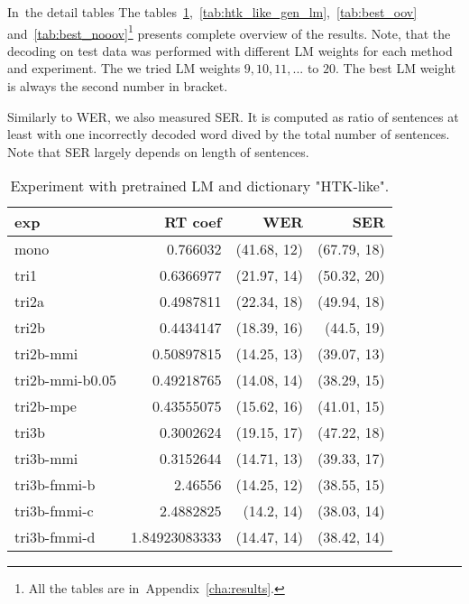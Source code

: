 In~the detail tables 
The tables~\ref{tab:htk_like},~\ref{tab:htk_like_gen_lm},~\ref{tab:best_oov} 
and~\ref{tab:best_nooov}\footnote{All the tables are in~Appendix~\ref{cha:results}.} presents complete overview of the results. 
Note, that the decoding on test data was performed with different \ac{LM} weights for each method and experiment. 
The we tried \ac{LM} weights $9, 10, 11, ...$ to $20$. 
The best \ac{LM} weight is always the second number in bracket.

Similarly to \ac{WER}, we also measured \ac{SER}. It is computed as ratio of sentences at least with one incorrectly decoded word dived by the total number of sentences. Note that \ac{SER} largely depends on length of sentences. 

\begin{table}[!htp]\label{tab:htk_like}\centering\begin{tabular}{l|rrr}
exp             & RT coef       & WER         & SER        \\ 
\hline
mono            & 0.766032      & (41.68, 12) & (67.79, 18)\\ 
tri1            & 0.6366977     & (21.97, 14) & (50.32, 20)\\ 
tri2a           & 0.4987811     & (22.34, 18) & (49.94, 18)\\ 
tri2b           & 0.4434147     & (18.39, 16) & (44.5, 19) \\ 
tri2b-mmi       & 0.50897815    & (14.25, 13) & (39.07, 13)\\ 
tri2b-mmi-b0.05 & 0.49218765    & (14.08, 14) & (38.29, 15)\\ 
tri2b-mpe       & 0.43555075    & (15.62, 16) & (41.01, 15)\\ 
tri3b           & 0.3002624     & (19.15, 17) & (47.22, 18)\\ 
tri3b-mmi       & 0.3152644     & (14.71, 13) & (39.33, 17)\\ 
tri3b-fmmi-b    & 2.46556       & (14.25, 12) & (38.55, 15)\\ 
tri3b-fmmi-c    & 2.4882825     & (14.2, 14)  & (38.03, 14)\\ 
tri3b-fmmi-d    & 1.84923083333 & (14.47, 14) & (38.42, 14)
\end{tabular}
\caption{Experiment with pretrained LM and dictionary "\ac{HTK}-like".}
\end{table}  

